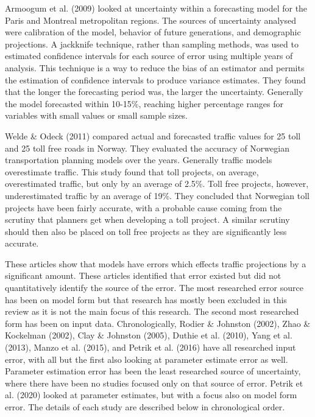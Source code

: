 \documentclass[fancy, masters, twoside]{byuthesis}
\begin{document}
Armoogum et al. (2009) looked at uncertainty within a forecasting model for the Paris and Montreal metropolitan regions. The sources of uncertainty analysed were calibration of the model, behavior of future generations, and demographic projections. A jackknife technique, rather than sampling methods, was used to estimated confidence intervals for each source of error using multiple years of analysis. This technique is a way to reduce the bias of an estimator and permits the estimation of confidence intervals to produce variance estimates. They found that the longer the forecasting period was, the larger the uncertainty. Generally the model forecasted within 10-15\%, reaching higher percentage ranges for variables with small values or small sample sizes.

Welde \& Odeck (2011) compared actual and forecasted traffic values for 25 toll and 25 toll free roads in Norway. They evaluated the accuracy of Norwegian transportation planning models over the years. Generally traffic models overestimate traffic. This study found that toll projects, on average, overestimated traffic, but only by an average of 2.5\%. Toll free projects, however, underestimated traffic by an average of 19\%. They concluded that Norwegian toll projects have been fairly accurate, with a probable cause coming from the scrutiny that planners get when developing a toll project. A similar scrutiny should then also be placed on toll free projects as they are significantly less accurate.

These articles show that models have errors which effects traffic projections by a significant amount. These articles identified that error existed but did not quantitatively identify the source of the error. The most researched error source has been on model form but that research has mostly been excluded in this review as it is not the main focus of this research. The second most researched form has been on input data. Chronologically, Rodier \& Johnston (2002), Zhao \& Kockelman (2002), Clay \& Johnston (2005), Duthie et al. (2010), Yang et al. (2013), Manzo et al. (2015), and Petrik et al. (2016) have all researched input error, with all but the first also looking at parameter estimate error as well. Parameter estimation error has been the least researched source of uncertainty, where there have been no studies focused only on that source of error. Petrik et al. (2020) looked at parameter estimates, but with a focus also on model form error. The details of each study are described below in chronological order.
\end{document}
